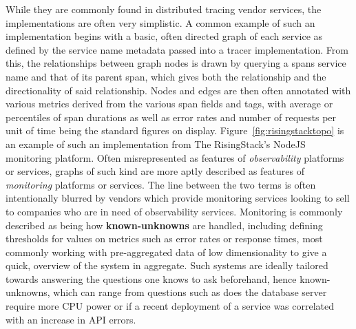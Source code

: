 \documentclass[12pt,pdftex,titlepage]{report}
\begin{document}
                While they are commonly found in distributed tracing vendor services, the implementations are often very simplistic. A common example of such an implementation begins with a basic, often directed
                graph of each service as defined by the service name metadata passed into a tracer implementation. From this, the relationships between graph nodes is drawn by querying a spans service name
                and that of its parent span, which gives both the relationship and the directionality of said relationship. Nodes and edges are then often annotated with various metrics derived from the various
                span fields and tags, with average or percentiles of span durations as well as error rates and number of requests per unit of time being the standard figures on display. Figure~\ref{fig:risingstacktopo}
                is an example of such an implementation from The RisingStack's NodeJS monitoring platform. Often misrepresented as features of \textit{observability} platforms or services, graphs of such kind are
                more aptly described as features of \textit{monitoring} platforms or services. The line between the two terms is often intentionally blurred by vendors which provide monitoring services looking to sell
                to companies who are in need of observability services. Monitoring is commonly described as being how \textbf{known-unknowns} are handled, including defining thresholds for values on metrics such as
                error rates or response times, most commonly working with pre-aggregated data of low dimensionality to give a quick, overview of the system in aggregate. Such systems are ideally tailored towards 
                answering the questions one knows to ask beforehand, hence known-unknowns, which can range from questions such as does the database server require more CPU power or if a recent deployment of a service
                was correlated with an increase in API errors. 
\end{document}
